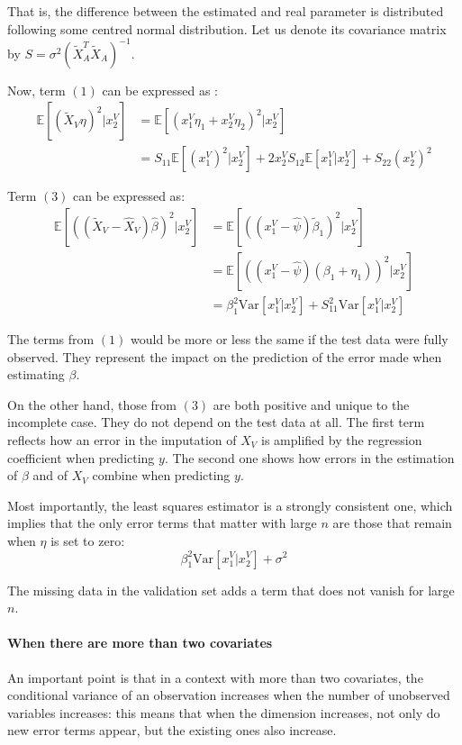 \documentclass[12pt, a4paper]{memoir}
\begin{document}
That is, the difference between the estimated and real parameter is distributed following some centred normal distribution. Let us denote its covariance matrix by $S = \sigma^2 (\tilde{X}_A^T \tilde{X}_A)^{-1} $.

Now, term $(1)$ can be expressed as :
\begin{align*}
\mathbb{E}[(\tilde{X}_V \eta)^2 \vert x^V_2] &= \mathbb{E}[(x^V_1 \eta_1 + x^V_2 \eta_2)^2\vert x^V_2] \\
											&= S_{11} \mathbb{E}[(x^V_1)^2 \vert x^V_2]  + 2x^V_2 S_{12} \mathbb{E}[x^V_1 \vert x^V_2] + S_{22} (x^V_2)^2
\end{align*}

Term $(3)$ can be expressed as:
\begin{align*}
\mathbb{E}[((\tilde{X}_V - \hat{X}_V) \hat{\beta})^2 \vert x^V_2]&= \mathbb{E}[((x^V_1 - \hat{\psi})\tilde{\beta}_1)^2 \vert x^V_2] \\
									 &= \mathbb{E}[((x^V_1 - \hat{\psi})(\beta_1 + \eta_1))^2 \vert x^V_2] \\
									&= \beta_1^2 \text{Var}[x^V_1 \vert x^V_2] + S_{11}^2 \text{Var}[x^V_1 \vert x^V_2] 
\end{align*}

The terms from $(1)$ would be more or less the same if the test data were fully observed. They represent the impact on the prediction of the error made when estimating $\beta$.

 On the other hand, those from $(3)$ are both positive and unique to the incomplete case. They do not depend on the test data at all. The first term reflects how an error in the imputation of $X_V$ is amplified by the regression coefficient when predicting $y$. The second one shows how errors in the estimation of $\beta$ and of $X_V$ combine when predicting $y$.
 
 Most importantly, the least squares estimator is a strongly consistent one\cite{consistency_linreg}, which implies that the only error terms that matter with large $n$ are those that remain when $\eta$ is set to zero:
 $$ \beta_1^2 \text{Var}[x^V_1 \vert x^V_2] + \sigma^2 $$
 
 The missing data in the validation set adds a term that does not vanish for large $n$.
 
 \paragraph*{When there are more than two covariates}
 An important point is that in a context with more than two covariates, the conditional variance of an observation increases when the number of unobserved variables increases: this means that when the dimension increases, not only do new error terms appear, but the existing ones also increase.
 
\end{document}
